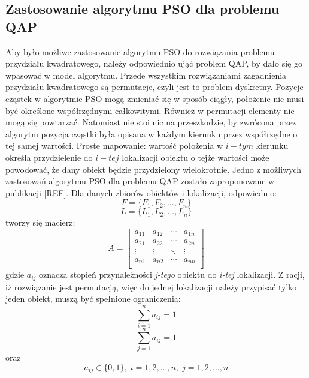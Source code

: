 \subsection{Zastosowanie algorytmu PSO dla problemu QAP}
Aby było możliwe zastosowanie algorytmu PSO do rozwiązania problemu przydziału kwadratowego, należy odpowiednio ująć problem QAP, by dało się go wpasować w model algorytmu. Przede wszystkim rozwiązaniami zagadnienia przydziału kwadratowego są permutacje, czyli jest to problem dyskretny. Pozycje cząstek w algorytmie PSO mogą zmieniać się w sposób ciągły, położenie nie musi być określone współrzędnymi całkowitymi. Również w permutacji elementy nie mogą się powtarzać. Natomiast nie stoi nic na przeszkodzie, by zwrócona przez algorytm pozycja cząstki była opisana w każdym kierunku przez współrzędne o tej samej wartości. Proste mapowanie: wartość położenia w $i-tym$ kierunku określa przydzielenie do $i-tej$ lokalizacji obiektu o tejże wartości może powodować, że dany obiekt będzie przydzielony wielokrotnie.
Jedno z możliwych zastosowań algorytmu PSO dla problemu QAP zostało zaproponowane w publikacji [REF]. Dla danych zbiorów obiektów i lokalizacji, odpowiednio:
\newline
\begin{equation}
F=\{F_1,F_2,...,F_n\}
\end{equation}
\newline
\begin{equation}
L=\{L_1,L_2,...,L_n\}
\end{equation}
\newline
tworzy się macierz:
\newline
\begin{equation}
\label{PSO_A}
A=
\begin{bmatrix}
a_{11} & a_{12} & \cdots & a_{1n} \\
a_{21} & a_{22} & \cdots & a_{2n} \\
\vdots & \vdots & \ddots & \vdots \\
a_{n1} & a_{n2} & \cdots & a_{nn} \\
\end{bmatrix}
\end{equation}
\newline
gdzie $a_{ij}$ oznacza stopień przynależności \textit{j-tego} obiektu do \textit{i-tej} lokalizacji. Z racji, iż rozwiązanie jest permutacją, więc do jednej lokalizacji należy przypisać tylko jeden obiekt, muszą być spełnione ograniczenia:
\newline
\begin{equation}
\label{pso_suma_po_i}
\sum\limits_{i=1}^n a_{ij}=1
\end{equation}
\newline
\begin{equation}
\label{pso_suma_po_j}
\sum\limits_{j=1}^n a_{ij}=1
\end{equation}
\newline
oraz
\newline
\begin{equation}
a_{ij} \in \{0,1\}, \; i=1,2,...,n, \; j=1,2,...,n
\end{equation}
\newline

